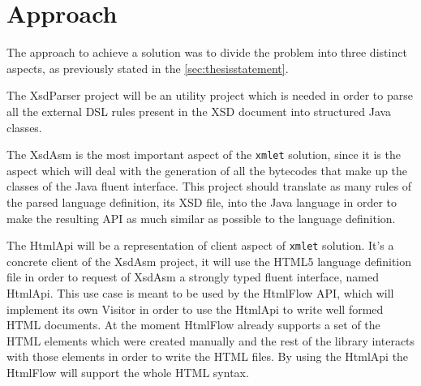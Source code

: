 \section{Approach}
\label{sec:approach}

The approach to achieve a solution was to divide the problem into three distinct aspects, as previously stated in the \ref{sec:thesisstatement}. 

\noindent
The XsdParser project will be an utility project which is needed in order to parse all the external \ac{DSL} rules present in the \ac{XSD} document into structured Java classes. 

\noindent
The XsdAsm is the most important aspect of the \texttt{xmlet} solution, since it is the aspect which will deal with the generation of all the bytecodes that make up the classes of the Java fluent interface. This project should translate as many rules of the parsed language definition, its \ac{XSD} file, into the Java language in order to make the resulting \ac{API} as much similar as possible to the language definition.

\noindent
The HtmlApi will be a representation of client aspect of \texttt{xmlet} solution. It's a concrete client of the XsdAsm project, it will use the \ac{HTML}5 language definition file in order to request of XsdAsm a strongly typed fluent interface, named HtmlApi. This use case is meant to be used by the HtmlFlow \ac{API}, which will implement its own Visitor in order to use the HtmlApi to write well formed \ac{HTML} documents. At the moment HtmlFlow already supports a set of the \ac{HTML} elements which were created manually and the rest of the library interacts with those elements in order to write the \ac{HTML} files. By using the HtmlApi the HtmlFlow will support the whole \ac{HTML} syntax. 